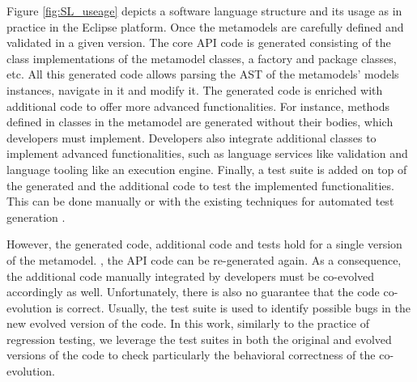 Figure \ref{fig:SL_useage} depicts a software language structure and its usage as in practice in the Eclipse platform.  
%
Once the metamodels are carefully defined and validated in a given version. The core API code is generated \cite{steinberg2008emf} consisting of the class implementations of the metamodel classes, a factory and package classes, etc. All this generated code allows parsing the AST of the metamodels' models instances, navigate in it and modify it. 
The generated code is enriched with additional code to offer more advanced functionalities. For instance, methods defined in classes in the metamodel are generated without their bodies, which developers must implement. %
Developers also integrate additional classes to implement advanced functionalities, such as language services like validation and language tooling like an execution engine. %
%
Finally, a test suite is added on top of the generated and the additional code to test the implemented functionalities. This can be done manually or with the existing techniques for automated test generation \cite{fraser2011evosuite,mcminn2004search,beyer2022advances}. 

\red{}However, the generated code, additional code and tests hold for a single version of the metamodel. 
, the API code can be re-generated again. As a consequence, the additional code manually integrated by developers must be co-evolved accordingly as well. 
Unfortunately, there is also no guarantee that the code co-evolution is correct. 
Usually, the test suite is used to identify possible bugs in the new evolved version of the code. In this work, similarly to the practice of regression testing, we leverage the test suites in both the original and evolved versions of the code to check particularly the behavioral correctness of the co-evolution.

